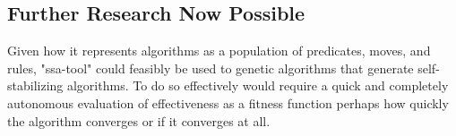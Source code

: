 \subsection{Further Research Now Possible}

\begin{task}
  \label{task:genetic}
  Given how it represents algorithms as a population of predicates, moves, and rules,
    "ssa-tool" could feasibly be used to genetic algorithms that generate
    self-stabilizing algorithms.
  To do so effectively would require a quick and completely autonomous
    evaluation of effectiveness as a fitness function \Dash
    perhaps how quickly the algorithm converges or if it converges at all.
\end{task}

